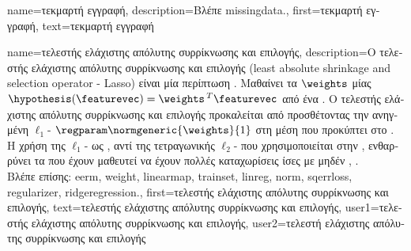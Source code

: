{name={\foreignlanguage{greek}{τεκμαρτή εγγραφή}},
	description={\foreignlanguage{greek}{Βλέπε} \gls{missingdata}.},
	first={\foreignlanguage{greek}{τεκμαρτή εγγραφή}},
	text={\foreignlanguage{greek}{τεκμαρτή εγγραφή}}  
}%

{name={\foreignlanguage{greek}{τελεστής ελάχιστης απόλυτης συρρίκνωσης και επιλογής}}, 
	description={\foreignlanguage{greek}{Ο τελεστής ελάχιστης απόλυτης συρρίκνωσης και 
		επιλογής} 
		(least absolute shrinkage and selection operator - Lasso) \foreignlanguage{greek}{είναι μία περίπτωση} 
		\cite{hastie01statisticallearning}. \foreignlanguage{greek}{Μαθαίνει τα} 
		 $\weights$ \foreignlanguage{greek}{μίας}  
		$\hypothesis(\featurevec) = \weights\,^{T} \featurevec$ \foreignlanguage{greek}{από ένα} . 
		\foreignlanguage{greek}{Ο τελεστής ελάχιστης απόλυτης συρρίκνωσης και επιλογής προκαλείται από} 
		 \foreignlanguage{greek}{προσθέτοντας την ανηγμένη} $\ell_{1}$- 
		$\regparam \normgeneric{\weights}{1}$ \foreignlanguage{greek}{στη μέση}  
		\foreignlanguage{greek}{που προκύπτει στο}  \cite{Tibshirani1996}. \foreignlanguage{greek}{Η χρήση 
		της} $\ell_{1}$- \foreignlanguage{greek}{ως} , \foreignlanguage{greek}{αντί της
		τετραγωνικής} $\ell_{2}$- \foreignlanguage{greek}{που χρησιμοποιείται στην} , 
		\foreignlanguage{greek}{ενθαρρύνει τα}  \foreignlanguage{greek}{που έχουν μαθευτεί να έχουν πολλές 
		καταχωρίσεις ίσες με μηδέν} \cite{Wain2019}, \cite{BuhlGeerBook}.
		\\
		\foreignlanguage{greek}{Βλέπε επίσης:} \gls{eerm}, \gls{weight}, \gls{linearmap}, \gls{trainset}, \gls{linreg}, \gls{norm}, \gls{sqerrloss},
		\gls{regularizer}, \gls{ridgeregression}.},
	first={\foreignlanguage{greek}{τελεστής ελάχιστης απόλυτης συρρίκνωσης και επιλογής}},
	text={\foreignlanguage{greek}{τελεστής ελάχιστης απόλυτης συρρίκνωσης και επιλογής}},
	user1={\foreignlanguage{greek}{τελεστής ελάχιστης απόλυτης συρρίκνωσης και επιλογής}}, %
  	user2={\foreignlanguage{greek}{τελεστή ελάχιστης απόλυτης συρρίκνωσης και επιλογής}} %
}

